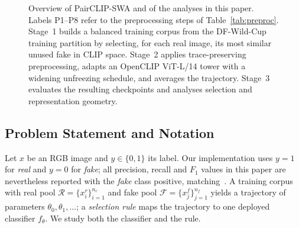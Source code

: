 \documentclass[10pt,journal]{IEEEtran}
\begin{document}
\begin{figure}[!t]
{}
\caption{Overview of PairCLIP-SWA and of the analyses in this paper. Labels
P1--P8 refer to the preprocessing steps of Table~\ref{tab:preproc}. Stage~1
builds a balanced training corpus from the DF-Wild-Cup training partition by
selecting, for each real image, its most similar unused fake in CLIP space.
Stage~2 applies trace-preserving preprocessing, adapts an OpenCLIP ViT-L/14
tower with a widening unfreezing schedule, and averages the trajectory. Stage~3
evaluates the resulting checkpoints and analyses selection and representation
geometry.}
\label{fig:pipeline}
\end{figure}

\subsection{Problem Statement and Notation}
Let $x$ be an RGB image and $y\in\{0,1\}$ its label. Our implementation uses
$y=1$ for \emph{real} and $y=0$ for \emph{fake}; all precision, recall and
$F_1$ values in this paper are nevertheless reported with the \emph{fake}
class positive, matching~\cite{bhattacharjee2026caenet}. A training corpus with
real pool $\mathcal{R}=\{x^r_i\}_{i=1}^{n_r}$ and fake pool
$\mathcal{F}=\{x^f_j\}_{j=1}^{n_f}$ yields a trajectory of parameters
$\theta_0,\theta_1,\dots$; a \emph{selection rule} maps the trajectory to one
deployed classifier $f_\theta$. We study both the classifier and the rule.

\end{document}
